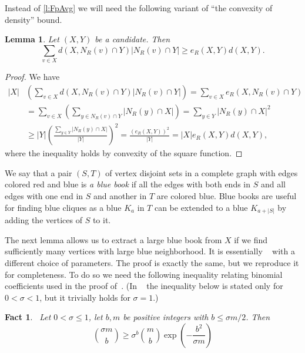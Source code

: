 \documentclass[reqno,final,12pt]{amsart}
\newtheorem{lem}[thm]{Lemma}
\newtheorem{fact}[thm]{Fact}
\newcommand{\fs}[2]{\left(\frac{#1}{#2}\right)}
\newcommand{\s}[1]{\left(#1\right)}
\begin{document}
Instead of \cref{l:FpAvg}   we will need the following variant of ``the convexity of density'' bound.
 
 \begin{lem}\label{l:FpAvg2}
 	Let $(X,Y)$ be a candidate. Then \begin{equation}
 	\sum_{v\in X}d(X,N_R(v) \cap Y)|N_R(v) \cap Y| \geq e_R(X,Y)d(X,Y).
 	\end{equation}
 \end{lem}
 \begin{proof}
We have
 	\begin{align*}
 |X|&\s{\sum_{v\in X}d(X,N_R(v) \cap Y)|N_R(v) \cap Y|} = \sum_{v \in X}e_R(X,N_R(v) \cap Y) \\ & = \sum_{v\in X} \s{\sum_{y \in N_R(v) \cap Y} |N_R(y) \cap X|} = \sum_{y \in Y}|N_R(y) \cap X|^2 \\ &\geq  |Y|\fs{\sum_{y \in Y}|N_R(y) \cap X|}{|Y|}^2 =\frac{(e_R(X,Y))^2}{|Y|}  =|X| e_R(X,Y)d(X,Y),
 	\end{align*}
 	where the inequality holds by convexity of the square function.
 \end{proof}	

We say that a pair $(S,T)$ of vertex disjoint sets in a complete graph with edges colored red and blue is \emph{a blue book} if all the edges with both ends in $S$ and all edges with one end in $S$ and another in $T$ are colored blue. Blue books are useful for finding blue cliques
as a blue $K_{a}$ in $T$ can be extended to a blue $K_{a+|S|}$  by adding the vertices of $S$ to it. 

The next lemma allows us to extract a large blue book from $X$ if we find sufficiently many vertices with large blue neighborhood. It is essentially ~\cite[Lemma 4.1]{CGMS23} with a different choice of parameters. The proof is exactly the same, but we reproduce it for completeness. To do so we need the following inequality relating binomial coefficients used in the proof of~\cite[Lemma 4.1]{CGMS23}. (In ~\cite{CGMS23} the inequality below is stated only for $0<\sigma < 1$, but it trivially holds for $\sigma =1$.)

\begin{fact}{~\cite[Fact 4.2]{CGMS23}}\label{f:binomial} Let $0< \sigma \leq 1$, let $b,m$ be positive integers with $b \leq \sigma m /2$. Then
\begin{equation}\label{e:binomial}
	\binom{\sigma m}{b} \geq \sigma^b\binom{m}{b}\exp\s{-\frac{b^2}{\sigma m}}
\end{equation}
\end{fact}	
\end{document}
